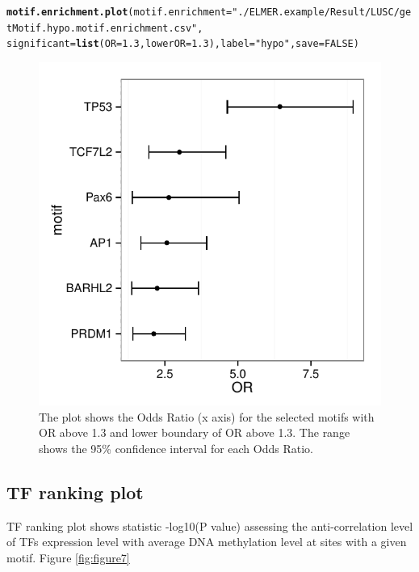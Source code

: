 \documentclass{article}\usepackage[]{graphicx}\usepackage[]{color}
\makeatletter
\def\maxwidth{ %
  \ifdim\Gin@nat@width>\linewidth
    \linewidth
  \else
    \Gin@nat@width
  \fi
}
\newcommand{\hlnum}[1]{\textcolor[rgb]{0.686,0.059,0.569}{#1}}%
\newcommand{\hlstr}[1]{\textcolor[rgb]{0.192,0.494,0.8}{#1}}%
\newcommand{\hlstd}[1]{\textcolor[rgb]{0.345,0.345,0.345}{#1}}%
\newcommand{\hlkwc}[1]{\textcolor[rgb]{0.333,0.667,0.333}{#1}}%
\newcommand{\hlkwd}[1]{\textcolor[rgb]{0.737,0.353,0.396}{\textbf{#1}}}%
\newenvironment{kframe}{%
 \def\at@end@of@kframe{}%
 \ifinner\ifhmode%
  \def\at@end@of@kframe{\end{minipage}}%
  \begin{minipage}{\columnwidth}%
 \fi\fi%
 \def\FrameCommand##1{\hskip\@totalleftmargin \hskip-\fboxsep
 \colorbox{shadecolor}{##1}\hskip-\fboxsep
     \hskip-\linewidth \hskip-\@totalleftmargin \hskip\columnwidth}%
 \MakeFramed {\advance\hsize-\width
   \@totalleftmargin\z@ \linewidth\hsize
   \@setminipage}}%
 {\par\unskip\endMakeFramed%
 \at@end@of@kframe}
\newenvironment{knitrout}{}{} %
\makeatother
\begin{document}
\begin{knitrout}
\color{fgcolor}\begin{kframe}
\begin{alltt}
\hlkwd{motif.enrichment.plot}\hlstd{(}\hlkwc{motif.enrichment}\hlstd{=}\hlstr{"./ELMER.example/Result/LUSC/getMotif.hypo.motif.enrichment.csv"}\hlstd{,}
                      \hlkwc{significant}\hlstd{=}\hlkwd{list}\hlstd{(}\hlkwc{OR}\hlstd{=}\hlnum{1.3}\hlstd{,} \hlkwc{lowerOR}\hlstd{=}\hlnum{1.3}\hlstd{),} \hlkwc{label}\hlstd{=}\hlstr{"hypo"}\hlstd{,} \hlkwc{save}\hlstd{=}\hlnum{FALSE}\hlstd{)}
\end{alltt}
\end{kframe}\begin{figure}
\includegraphics[width=\maxwidth]{figure/figure6-1} \caption[Motif Enrichment]{\label{fig:hypo.motif.enrichment} The plot shows the Odds Ratio (x axis) for the selected motifs with OR above 1.3 and lower boundary of OR above 1.3. The range shows the 95\% confidence interval for each Odds Ratio.}\label{fig:figure6}
\end{figure}


\end{knitrout}

\subsection{TF ranking plot}
TF ranking plot shows statistic -log10(P value) assessing the anti-correlation level 
of TFs expression level with average DNA methylation level at sites with a given motif. Figure \ref{fig:figure7}
\end{document}
